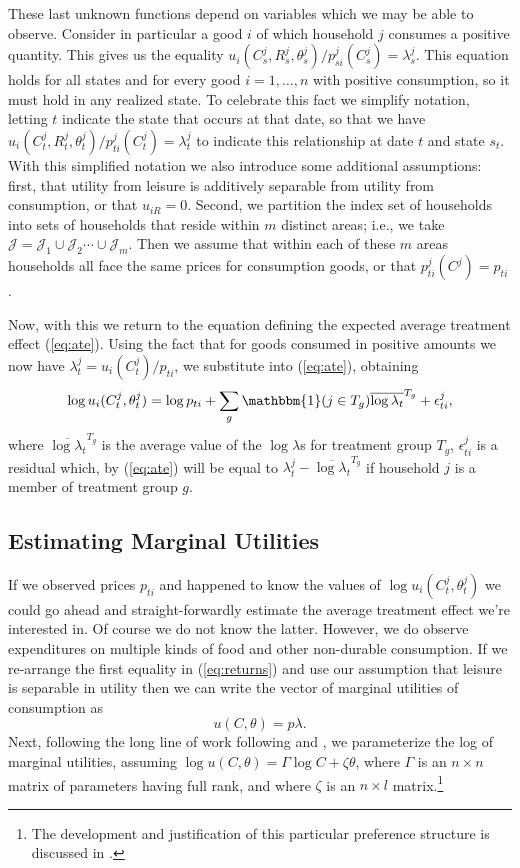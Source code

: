 \documentclass[11pt]{article}
\newcommand{\one}{\ensuremath{\mathbbm{1}}}
\newcommand{\Eq}[1]{(\ref{eq:#1})}
\begin{document}
These last unknown functions depend on variables which we may be able
to observe.  Consider in particular a good $i$ of which household $j$
consumes a positive quantity.  This gives us the equality
$u_{i}(C^j_s,R^j_s,\theta^j_s)/p^j_{si}(C^j_s)=\lambda^j_s$.  This
equation holds for all states and for every good $i=1,\dots,n$ with
positive consumption, so it must hold in any realized state.  To
celebrate this fact we simplify notation, letting $t$ indicate the
state that occurs at that date, so that we have
$u_{i}(C^j_t,R^j_t,\theta^j_t)/p^j_{ti}(C^j_t)=\lambda^j_t$ to
indicate this relationship at date $t$ and state $s_t$.  With this
simplified notation we also introduce some additional assumptions:
first, that utility from leisure is additively separable from utility
from consumption, or that $u_{iR}=0$.  Second, we partition the index
set of households into sets of households that reside within $m$
distinct areas; i.e., we take
$\mathcal{J}=\mathcal{J}_1\cup\mathcal{J}_2\cdots\cup\mathcal{J}_m$.
Then we assume that within each of these $m$ areas households all face
the same prices for consumption goods, or that $p^j_{ti}(C^j)=p_{ti}$.

Now, with this we return to the equation defining the expected average
treatment effect  \Eq{ate}.  Using the fact that for goods consumed in
positive amounts we now have
$\lambda^j_t=u_i(C^j_t)/p_{ti}$, we substitute into \Eq{ate},
obtaining
\[
   \log u_i(C^j_t,\theta^j_t) = \log p_{ti} + \sum_g\one(j\in T_g)\overline{\log\lambda_t}^{T_g} + \epsilon^j_{ti},
\]
where $\overline{\log\lambda_t}^{T_g}$ is the average value of the
\(\log\lambda\)s for treatment group $T_g$,
$\epsilon^j_{ti}$ is a residual which, by \Eq{ate} will be equal to
$\lambda^j_t-\overline{\log\lambda_t}^{T_g}$ if household \(j\) is a member
of treatment group $g$.

\subsection*{Estimating Marginal Utilities}
\label{sec-5-1}

If we observed prices $p_{ti}$ and happened to know the values of
$\log u_i(C^j_t,\theta^j_t)$ we could go ahead and straight-forwardly
estimate the average treatment effect we're interested in.  Of course
we do not know the latter.  However, we do observe expenditures on
multiple kinds of food and other non-durable consumption.  If we
re-arrange the first equality in \Eq{returns} and use our assumption
that leisure is separable in utility then we can write the vector of
marginal utilities of consumption as \[ u(C,\theta)=p\lambda.  \]
Next, following the long line of work following
\cite{Heckman-Macurdy80} and \cite{Macurdy83}, we parameterize the log
of marginal utilities, assuming $\log u(C,\theta)=\Gamma\log C +
\zeta\theta$, where $\Gamma$ is an $n\times n$ matrix of parameters
having full rank, and where $\zeta$ is an $n\times l$ matrix.\footnote{The
development and justification of this particular preference structure
is discussed in \cite{ligon15}.}
\end{document}

